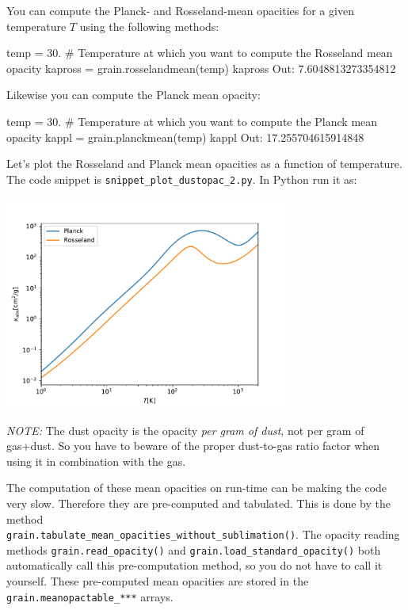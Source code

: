 \documentclass{book}
\newcommand{\code}[1]{{\small\tt #1}}
\begin{document}
You can compute the Planck- and Rosseland-mean opacities for a given
temperature $T$ using the following methods:
\begin{codebox}
temp = 30.     # Temperature at which you want to compute the Rosseland mean opacity
kapross = grain.rosselandmean(temp)
kapross
Out: 7.6048813273354812
\end{codebox}
Likewise you can compute the Planck mean opacity:
\begin{codebox}
temp = 30.     # Temperature at which you want to compute the Planck mean opacity
kappl = grain.planckmean(temp)
kappl
Out: 17.255704615914848
\end{codebox}

Let's plot the Rosseland and Planck mean opacities as a function of
temperature.\\ The code snippet is
\code{snippet\_plot\_dustopac\_2.py}. In Python run it as:
\begin{codebox}
\end{codebox}
\centerline{\includegraphics[width=0.7\textwidth]{../snippets/fig_snippet_plot_dustopac_2_1.pdf}}

{\em NOTE:} The dust opacity is the opacity {\em per gram of dust},
not per gram of gas+dust. So you have to beware of the proper
dust-to-gas ratio factor when using it in combination with the gas.

The computation of these mean opacities on run-time can be making
the code very slow. Therefore they are pre-computed and tabulated. This
is done by the method\\
\code{grain.tabulate\_mean\_opacities\_without\_sublimation()}. The
opacity reading methods \code{grain.read\_opacity()} and
\code{grain.load\_standard\_opacity()} both automatically call
this pre-computation method, so you do not have to call it yourself.
These pre-computed mean opacities are stored in the
\code{grain.meanopactable\_***} arrays.
\end{document}
